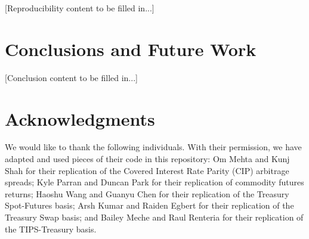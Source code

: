 \documentclass{article}
\begin{document}
[Reproducibility content to be filled in...]

\section{Conclusions and Future Work}
\label{sec:conclusion}


[Conclusion content to be filled in...]

\section*{Acknowledgments}

We would like to thank the following individuals. With their permission, we have adapted and used pieces of their code in this repository: Om Mehta and Kunj Shah for their replication of the Covered Interest Rate Parity (CIP) arbitrage spreads; Kyle Parran and Duncan Park for their replication of commodity futures returns; Haoshu Wang and Guanyu Chen for their replication of the Treasury Spot-Futures basis; Arsh Kumar and Raiden Egbert for their replication of the Treasury Swap basis; and Bailey Meche and Raul Renteria for their replication of the TIPS-Treasury basis.






\end{document}
